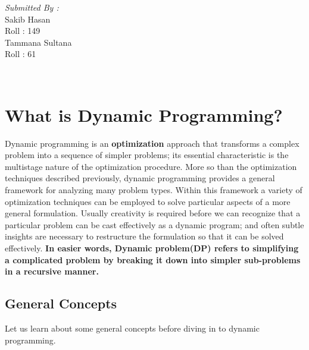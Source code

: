 \documentclass[12pt]{article}
\begin{document}
\begin{titlepage}
\begin{minipage}{0.4\textwidth}
			\begin{flushright} \large
			\emph{Submitted By :} \\
			\vspace{6mm}
			Sakib Hasan\\
           		 Roll : 149\\
			\vspace{6mm}
            		Tammana Sultana\\
            		Roll : 61\\
		\end{flushright}
       
	\end{minipage}\\[10mm]
	
\end{titlepage}
  \newpage
  \section{What is Dynamic Programming?}
  Dynamic programming is an \textbf{optimization} approach that transforms a complex problem into a sequence of simpler problems; its essential characteristic is the multistage nature of the
  optimization procedure. More so than the optimization techniques described previously, dynamic programming provides a general framework for analyzing many problem types. Within this
  framework a variety of optimization techniques can be employed to solve particular aspects of a more general formulation. Usually creativity is required before we can recognize that a
  particular problem can be cast effectively as a dynamic program; and often subtle insights are necessary to restructure the formulation so that it can be solved effectively.\vspace{3mm} 
  \newline  \textbf{In easier words, Dynamic problem(DP) refers to simplifying a complicated problem by breaking it down into simpler sub-problems in a recursive manner.}

\subsection{General Concepts}
Let us learn about some general concepts before diving in to dynamic programming.
\end{document}
